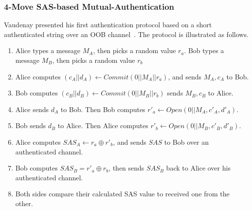 \subsubsection*{4-Move SAS-based Mutual-Authentication}

Vaudenay presented his first authentication protocol based on a short authenticated string over an OOB channel~\cite{Vaudenay:2005qa}. The protocol is illustrated as follows.

\begin{enumerate}
\item Alice types a message $M_A$, then picks a random value $r_a$. Bob types a message $M_B$, then picks a random value $r_b$
\item Alice computes $(c_A||d_A) \leftarrow Commit(0||M_A||r_a)$, and sends $M_A, c_A$ to Bob.
\item Bob computes $(c_B||d_B) \leftarrow Commit(0||M_B||r_b)$ sends $M_B, c_B$ to Alice.
\item Alice sends $d_A$ to Bob. Then Bob computes $r'_a \leftarrow Open(0||M_A,c'_A,d'_A)$. 
\item Bob sends $d_B$ to Alice. Then Alice computes $r'_b \leftarrow Open(0||M_B,c'_B,d'_B)$. 
\item Alice computes $SAS_A \leftarrow r_a \oplus r'_b$, and sends $SAS$ to Bob over an authenticated channel. 
\item Bob computes $SAS_B = r'_a \oplus r_b$, then sends $SAS_B$ back to Alice over his authenticated channel. 
\item Both sides compare their calculated SAS value to received one from the other. 
\end{enumerate}

